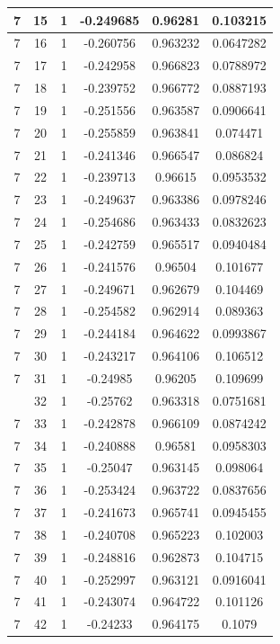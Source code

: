 \documentclass[12pt,a4paper]{article}
\numberwithin{equation}{section}
\numberwithin{figure}{section}
\numberwithin{table}{section}
\begin{document}
\begin{longtable}{|c|c|c|c|c|c|}
7 & 15 & 1 & -0.249685 & 0.96281 & 0.103215 \\ \hline
7 & 16 & 1 & -0.260756 & 0.963232 & 0.0647282 \\ \hline
7 & 17 & 1 & -0.242958 & 0.966823 & 0.0788972 \\ \hline
7 & 18 & 1 & -0.239752 & 0.966772 & 0.0887193 \\ \hline
7 & 19 & 1 & -0.251556 & 0.963587 & 0.0906641 \\ \hline
7 & 20 & 1 & -0.255859 & 0.963841 & 0.074471 \\ \hline
7 & 21 & 1 & -0.241346 & 0.966547 & 0.086824 \\ \hline
7 & 22 & 1 & -0.239713 & 0.96615 & 0.0953532 \\ \hline
7 & 23 & 1 & -0.249637 & 0.963386 & 0.0978246 \\ \hline
7 & 24 & 1 & -0.254686 & 0.963433 & 0.0832623 \\ \hline
7 & 25 & 1 & -0.242759 & 0.965517 & 0.0940484 \\ \hline
7 & 26 & 1 & -0.241576 & 0.96504 & 0.101677 \\ \hline
7 & 27 & 1 & -0.249671 & 0.962679 & 0.104469 \\ \hline
7 & 28 & 1 & -0.254582 & 0.962914 & 0.089363 \\ \hline
7 & 29 & 1 & -0.244184 & 0.964622 & 0.0993867 \\ \hline
7 & 30 & 1 & -0.243217 & 0.964106 & 0.106512 \\ \hline
7 & 31 & 1 & -0.24985 & 0.96205 & 0.109699 \\ \hline
\pagebreak
7 & 32 & 1 & -0.25762 & 0.963318 & 0.0751681 \\ \hline
7 & 33 & 1 & -0.242878 & 0.966109 & 0.0874242 \\ \hline
7 & 34 & 1 & -0.240888 & 0.96581 & 0.0958303 \\ \hline
7 & 35 & 1 & -0.25047 & 0.963145 & 0.098064 \\ \hline
7 & 36 & 1 & -0.253424 & 0.963722 & 0.0837656 \\ \hline
7 & 37 & 1 & -0.241673 & 0.965741 & 0.0945455 \\ \hline
7 & 38 & 1 & -0.240708 & 0.965223 & 0.102003 \\ \hline
7 & 39 & 1 & -0.248816 & 0.962873 & 0.104715 \\ \hline
7 & 40 & 1 & -0.252997 & 0.963121 & 0.0916041 \\ \hline
7 & 41 & 1 & -0.243074 & 0.964722 & 0.101126 \\ \hline
7 & 42 & 1 & -0.24233 & 0.964175 & 0.1079 \\ \hline

\end{longtable}
\end{document}
